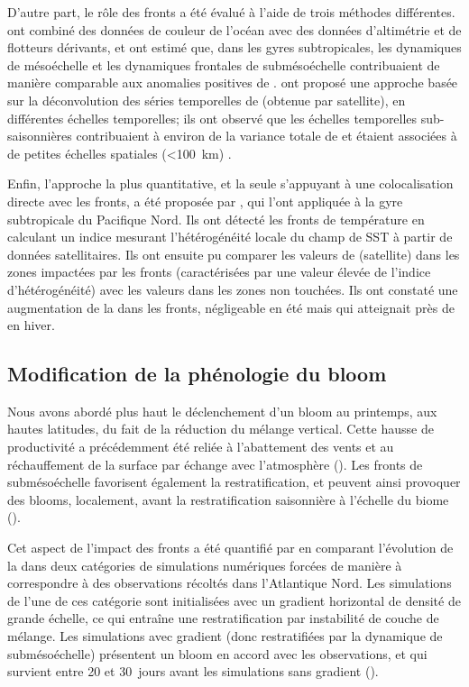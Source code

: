 D'autre part, le rôle des fronts a été évalué à l'aide de trois méthodes différentes.
\Textcite{guo_2019} ont combiné des données de couleur de l'océan avec des données d'altimétrie et de flotteurs dérivants, et ont estimé que, dans les gyres subtropicales, les dynamiques de mésoéchelle et les dynamiques frontales de submésoéchelle contribuaient de manière comparable aux anomalies positives de .
\Textcite{keerthi_2022} ont proposé une approche basée sur la déconvolution des séries temporelles de  (obtenue par satellite), en différentes échelles temporelles; ils ont observé que les échelles temporelles sub-saisonnières contribuaient à environ  de la variance totale de  et étaient associées à de petites échelles spatiales (\qty{<100}{\km}) .

Enfin, l'approche la plus quantitative, et la seule s'appuyant à une colocalisation directe avec les fronts, a été proposée par \textcite{liu_2016}, qui l'ont appliquée à la gyre subtropicale du Pacifique Nord.
Ils ont détecté les fronts de température en calculant un indice mesurant l'hétérogénéité locale du champ de SST à partir de données satellitaires.
Ils ont ensuite pu comparer les valeurs de  (satellite) dans les zones impactées par les fronts (caractérisées par une valeur élevée de l'indice d'hétérogénéité) avec les valeurs dans les zones non touchées.
Ils ont constaté une augmentation de la  dans les fronts, négligeable en été mais qui atteignait près de  en hiver.

\subsection{Modification de la phénologie du bloom}
\label{sec:modif-phenologie}

Nous avons abordé plus haut le déclenchement d'un bloom au printemps, aux hautes latitudes, du fait de la réduction du mélange vertical.
Cette hausse de productivité a précédemment été reliée à l'abattement des vents et au réchauffement de la surface par échange avec l'atmosphère (\cite{henson_2006,taylor_2011a}).
Les fronts de submésoéchelle favorisent également la restratification, et peuvent ainsi provoquer des blooms, localement, avant la restratification saisonnière à l'échelle du biome (\cite{taylor_2011,karleskind_2011,mahadevan_2012}).

Cet aspect de l'impact des fronts a été quantifié par \textcite{mahadevan_2012} en comparant l'évolution de la  dans deux catégories de simulations numériques forcées de manière à correspondre à des observations récoltés dans l'Atlantique Nord. Les simulations de l'une de ces catégorie sont initialisées avec un gradient horizontal de densité de grande échelle, ce qui entraîne une restratification par instabilité de couche de mélange.
Les simulations avec gradient (donc restratifiées par la dynamique de submésoéchelle) présentent un bloom en accord avec les observations, et qui survient entre 20 et 30~jours avant les simulations sans gradient ().

